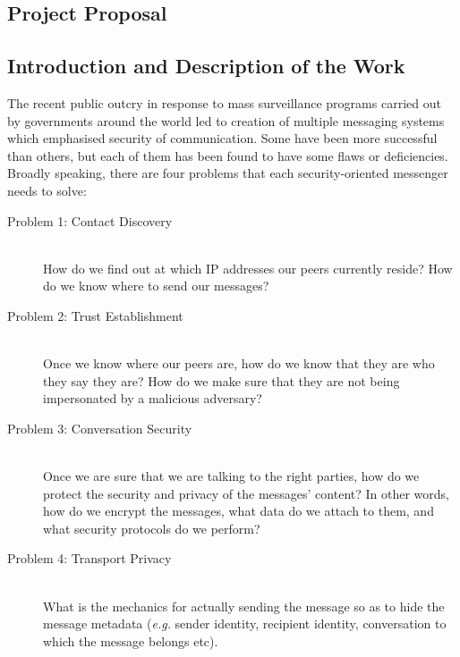 \documentclass[a4paper, twoside, 12pt]{report}
\newcommand{\skippage}{\newpage\null\newpage}
\begin{document}
\begin{appendices}

\skippage

\chapter{Project Proposal}
\label{appendix:proposal}
\section{Introduction and Description of the Work}
\label{intro}
The recent public outcry in response to mass surveillance programs carried out by governments around the world led to creation of multiple messaging systems which emphasised security of communication. Some have been more successful than others, but each of them has been found to have some flaws or deficiencies. Broadly speaking, there are four problems that each security-oriented messenger needs to solve:
\begin{description}
    \item[Problem 1: Contact Discovery] \hfill \\
        How do we find out at which IP addresses our peers currently reside? How do we know where to send our messages?
    \item[Problem 2: Trust Establishment]\hfill \\
        Once we know where our peers are, how do we know that they are who they say they are? How do we make sure that they are not being impersonated by a malicious adversary?
    \item[Problem 3: Conversation Security]\hfill \\
        Once we are sure that we are talking to the right parties, how do we protect the security and privacy of the messages' content? In other words, how do we encrypt the messages, what data do we attach to them, and what security protocols do we perform?
    \item[Problem 4: Transport Privacy]\hfill \\
        What is the mechanics for actually sending the message so as to hide the message metadata (\textit{e.g.} sender identity, recipient identity, conversation to which the message belongs etc).
\end{description}


\end{appendices}
\end{document}
